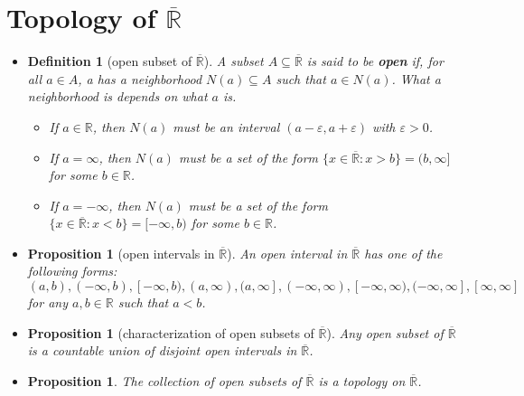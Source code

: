\documentclass[10pt]{article}
\newtheorem{definition}[lemma]{Definition}
\newtheorem{proposition}[lemma]{Proposition}
\numberwithin{lemma}{section}
\newcommand{\Real}{\mathbb{R}}
\begin{document}
\section{Topology of $\overline{\Real}$}

\begin{itemize}
  \item \begin{definition}[open subset of $\overline{\Real}$]
    A subset $A \subseteq \overline{\Real}$ is said to be {\bf open} if, for all $a \in A$, a has a neighborhood $N(a) \subseteq A$ such that $a \in N(a)$. What a neighborhood is depends on what $a$ is.
    \begin{itemize}
      \item If $a \in \Real$, then $N(a)$ must be an interval $(a - \varepsilon, a+\varepsilon)$ with  $\varepsilon > 0$.
      \item If $a = \infty$, then $N(a)$ must be a set of the form $\{ x \in \overline{\Real} : x > b \} = (b, \infty]$ for some $b \in \Real$.
      \item If $a = -\infty$, then $N(a)$ must be a set of the form $\{ x \in \overline{\Real} : x < b \} = [-\infty, b)$ for some $b \in \Real$.
    \end{itemize}
  \end{definition}

  \item \begin{proposition}[open intervals in $\overline{\Real}$]
    An open interval in $\overline{\Real}$ has one of the following forms: $$(a,b), (-\infty, b), [-\infty,b), (a,\infty), (a,\infty], (-\infty, \infty), [-\infty, \infty), (-\infty, \infty], [\infty, \infty]$$
    for any $a, b \in \Real$ such that $a < b$.
  \end{proposition}

  \item \begin{proposition}[characterization of open subsets of $\overline{\Real}$]
    Any open subset of $\overline{\Real}$ is a countable union of disjoint open intervals in $\overline{\Real}$.
  \end{proposition}

  \item \begin{proposition}
    The collection of open subsets of $\overline{\Real}$ is a topology on $\overline{\Real}$.
  \end{proposition}
\end{itemize}
\end{document}
